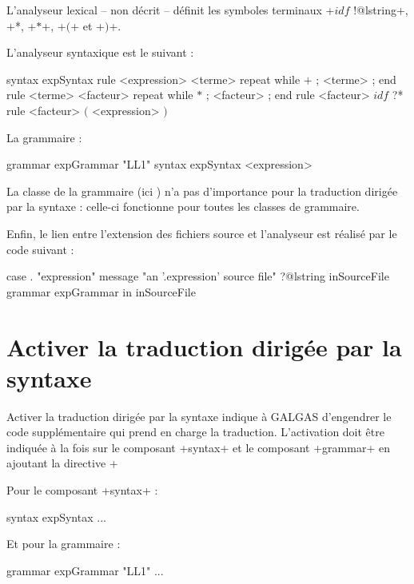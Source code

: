 L'analyseur lexical -- non décrit -- définit les symboles terminaux \ggsq+$idf$ !@lstring+, \ggsq*$+$*, \ggsq+$*$+, \ggsq+$($+ et \ggsq+$)$+.

L'analyseur syntaxique est le suivant :
\begin{galgas4}
syntax expSyntax {
  rule <expression> {
    <terme>
    repeat while $+$ ; <terme> ; end
  }
  rule <terme> {
    <facteur>
    repeat while $*$ ; <facteur> ; end
  }
  rule <facteur> {
    $idf$ ?*
  }
  rule <facteur> {
    $($
    <expression>
    $)$
  }
}
\end{galgas4}

La grammaire :
\begin{galgas4}
grammar expGrammar "LL1" {
  syntax expSyntax
  <expression>
}
\end{galgas4}

La classe de la grammaire (ici ) n'a pas d'importance pour la traduction dirigée par la syntaxe : celle-ci fonctionne pour toutes les classes de grammaire.

Enfin, le lien entre l'extension des fichiers source et l'analyseur est réalisé par le code suivant :
\begin{galgas4}
case . "expression"
message "an '.expression' source file"
?@lstring inSourceFile {
  grammar expGrammar in inSourceFile
}
\end{galgas4}








\section{Activer la traduction dirigée par la syntaxe}

Activer la traduction dirigée par la syntaxe indique à GALGAS d'engendrer le code supplémentaire qui prend en charge la traduction. L'activation doit être indiquée à la fois sur le composant \ggsq+syntax+ et le composant \ggsq+grammar+ en ajoutant la directive \ggsq+%

Pour le composant \ggsq+syntax+ :
\begin{galgas4}
syntax expSyntax %
  ...
\end{galgas4}

Et pour la grammaire :
\begin{galgas4}
grammar expGrammar "LL1" %
  ...
\end{galgas4}

